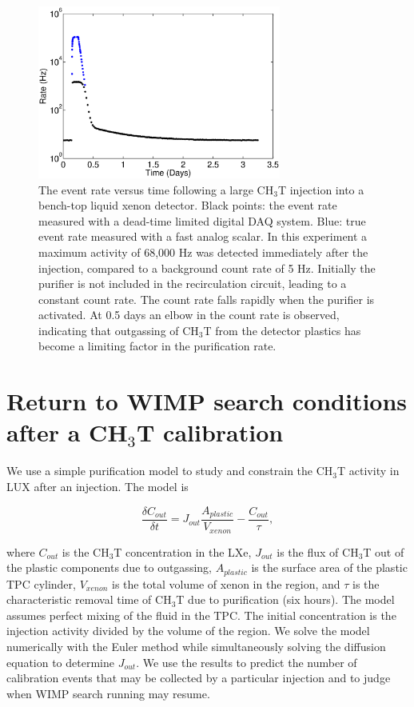 \begin{figure}[h!]\centering
\includegraphics[width=80mm]{fig/TimeHisto_Analog2.eps}
\caption{The event rate versus time following a large CH$_3$T injection into a bench-top liquid xenon detector. Black points: the event rate measured with a dead-time limited digital DAQ system. Blue: true event rate measured with a fast analog scalar. In this experiment a maximum activity of 68,000 Hz was detected immediately after the injection, compared to a background count rate of 5 Hz. Initially the purifier is not included in the recirculation circuit, leading to a constant count rate. The count rate falls rapidly when the purifier is activated. At 0.5 days an elbow in the count rate is observed, indicating that outgassing of CH$_3$T from the detector plastics has become a limiting factor in the purification rate. }
\label{fig:Density}
\end{figure}


\section{Return to WIMP search conditions after a CH$_3$T calibration }
\label{sec:appendix2}

We use a simple purification model to study and constrain the CH$_3$T activity in LUX after an injection. The model is 

\begin{equation}
\frac{\delta C_{out}}{\delta t} = J_{out} \frac{A_{plastic}}{V_{xenon}}-\frac{C_{out}}{\tau},
\end{equation}

\noindent where  $C_{out}$ is the CH$_3$T concentration in the LXe,  $J_{out}$ is the flux of CH$_3$T out of the plastic components due to outgassing,  $A_{plastic}$ is the surface area of the plastic TPC cylinder, $V_{xenon}$ is the total volume of xenon in the  region, and $\tau$ is the characteristic removal time of CH$_3$T due to purification (six hours). The model assumes perfect mixing of the fluid in the TPC. The initial concentration is the injection activity divided by the volume of the  region. We solve the model numerically with the Euler method while simultaneously solving the diffusion equation to determine $J_{out}$. We use the results to predict the number of calibration events that may be collected by a particular injection and to judge when WIMP search running may resume.

